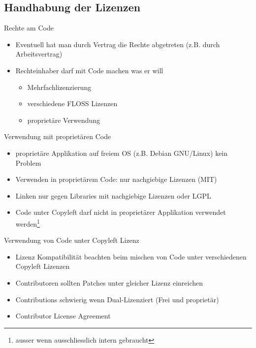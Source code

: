 \subsection{Handhabung der Lizenzen}
\label{sec:handhabung}
\subsectionframe

\begin{frame}{Rechte am Code}
	\begin{itemize}
		\item Eventuell hat man durch Vertrag die Rechte abgetreten (z.B. durch Arbeitsvertrag)
		\item Rechteinhaber darf mit Code machen was er will
		\begin{itemize}
			\item Mehrfachlizenzierung
			\item verschiedene FLOSS Lizenzen
			\item proprietäre Verwendung
		\end{itemize}
	\end{itemize}
\end{frame}

\begin{frame}{Verwendung mit proprietären Code}
	\begin{itemize}
		\item proprietäre Applikation auf freiem OS (z.B. Debian GNU/Linux) kein Problem
		\item Verwenden in proprietärem Code: nur nachgiebige Lizenzen (MIT)
		\item Linken nur gegen Libraries mit nachgiebige Lizenzen oder LGPL
		\item Code unter Copyleft darf nicht in proprietärer Applikation verwendet werden\footnote{ausser wenn ausschliesslich intern gebraucht}
	\end{itemize}
\end{frame}

\begin{frame}{Verwendung von Code unter Copyleft Lizenz}
	\begin{itemize}
		\item Lizenz Kompatibilität beachten beim mischen von Code unter verschiedenen Copyleft Lizenzen
		\item Contributoren sollten Patches unter gleicher Lizenz einreichen
		\item Contributions schwierig wenn Dual-Lizenziert (Frei und proprietär)
		\item Contributor License Agreement
	\end{itemize}
\end{frame}

